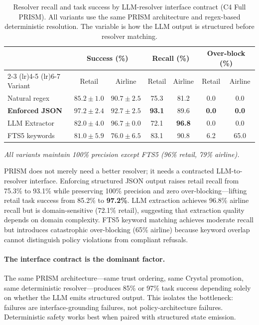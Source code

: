 \documentclass[11pt]{article}
\begin{document}
\begin{table}[h]
\centering
\caption{Resolver recall and task success by LLM-resolver interface contract (C4 Full PRISM).
All variants use the same PRISM architecture and regex-based deterministic resolution.
The variable is how the LLM output is structured before resolver matching.}
\label{tab:interface}
\small
\begin{tabular}{@{}l cc cc cc@{}}
\toprule
& \multicolumn{2}{c}{Success (\%)} & \multicolumn{2}{c}{Recall (\%)} & \multicolumn{2}{c}{Over-block (\%)} \\
\cmidrule(lr){2-3} \cmidrule(lr){4-5} \cmidrule(lr){6-7}
Variant & Retail & Airline & Retail & Airline & Retail & Airline \\
\midrule
Natural regex       & $85.2 \pm 1.0$ & $90.7 \pm 2.5$ & 75.3 & 81.2 & 0.0 & 0.0 \\
\textbf{Enforced JSON} & $\mathbf{97.2 \pm 2.4}$ & $\mathbf{92.7 \pm 2.5}$ & \textbf{93.1} & 89.6 & \textbf{0.0} & \textbf{0.0} \\
LLM Extractor       & $82.0 \pm 4.0$ & $96.7 \pm 0.0$ & 72.1 & \textbf{96.8} & 0.0 & 0.0 \\
FTS5 keywords       & $81.0 \pm 5.9$ & $76.0 \pm 6.5$ & 83.1 & 90.8 & 6.2 & 65.0 \\
\bottomrule
\end{tabular}
\vspace{1mm}

\small\emph{All variants maintain 100\% precision except FTS5 (96\% retail, 79\% airline).}
\end{table}

\noindent PRISM does not merely need a better resolver; it needs a contracted
LLM-to-resolver interface.
Enforcing structured JSON output raises retail recall from 75.3\% to 93.1\%
while preserving 100\% precision and zero over-blocking---lifting
retail task success from 85.2\% to \textbf{97.2\%}.
LLM extraction achieves 96.8\% airline recall but is domain-sensitive
(72.1\% retail), suggesting that extraction quality depends on domain complexity.
FTS5 keyword matching achieves moderate recall but introduces
catastrophic over-blocking (65\% airline) because keyword overlap cannot
distinguish policy violations from compliant refusals.

\paragraph{The interface contract is the dominant factor.}
The same PRISM architecture---same trust ordering, same Crystal promotion,
same deterministic resolver---produces 85\% or 97\% task success depending
solely on whether the LLM emits structured output.
This isolates the bottleneck: failures are interface-grounding failures,
not policy-architecture failures.
Deterministic safety works best when paired with structured state emission.
\end{document}
